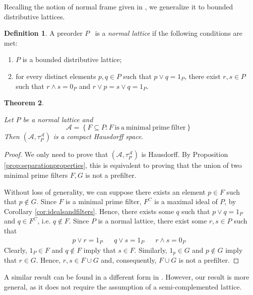 \documentclass{article}
\newcommand{\aaa}{\mathcal{A} }
\newcommand{\atpa}{(\aaa, \tau^\aaa_P)}
\theoremstyle{plain}
\newtheorem{theorem}{Theorem}[subsection]
\theoremstyle{definition}
\newtheorem{definition}[theorem]{Definition}
\theoremstyle{remark}
\newcommand{\bp}[1]{\left\lbrace #1 \right\rbrace}
\newcommand{\0}{\mathbbm 0}
\newcommand{\1}{\mathbbm 1}
\newcommand{\2}{\mathbbm 2}
\begin{document}
Recalling the notion of normal frame given in \cite{picado2011frames}, we generalize it to  bounded distributive lattices.


\begin{definition} 
\label{def:normallattice}
A preorder $P$ \ is a \emph{normal lattice} if the following conditions are met:
\begin{enumerate}
    \item \label{def:normallattice1}
$P$ is a bounded distributive lattice; 
    \item \label{def:normallattice2}
for every distinct elements $p,q \in P$  such that $p \vee q=1_P$, there exist $r,s \in P$ such that $r \wedge s=0_P$ and $r\vee p=s \vee q=1_P$.
\end{enumerate} 
\end{definition}



\begin{theorem}
\label{thm:compactT2}

     Let $P$ be a normal lattice and 
     \[
     \aaa=\bp{F \subseteq P: F\mathrm{ \ is\ a\ minimal\ prime\ filter }}
     \]
     Then $\atpa$ is a compact Hausdorff space. 
\end{theorem}

\begin{proof}
    We only need to prove that $\atpa$ is Hausdorff. By Proposition \ref{prop:separationproperties}, this is equivalent to proving that the union of two minimal prime filters $F,G$ is not a prefilter.

    Without loss of generality, we can suppose there exists an element $p \in F$ such that $p \notin G$. Since $F$ is a minimal prime filter, $F^C$ is a maximal ideal of $P$, by Corollary \ref{cor:idealsandfilters}. Hence, there exists some $q$ such that $p \vee q=1_P$ and  $q \in F^C$, i.e. $q \notin F$. Since $P$ is a normal lattice, there exist some $r,s \in P$ such that \begin{align*}
        p \vee r=1_P && q \vee s=1_P && r \wedge s=0_P
    \end{align*}
    Clearly, $1_P \in F$ and $q \notin F$ imply that $s \in F$. Similarly, $1_p \in G$ and $p \notin G$ imply that $r \in G$. Hence, $r,s \in F \cup G$ and, consequently, $F \cup G$ is not a prefilter. 
\end{proof}

A similar result  can be found in a different form in \cite[Thm. 7.3]{Cornish1972NormalL}. However, our result is more general, as it does not require the assumption of a semi-complemented lattice. 
\end{document}
